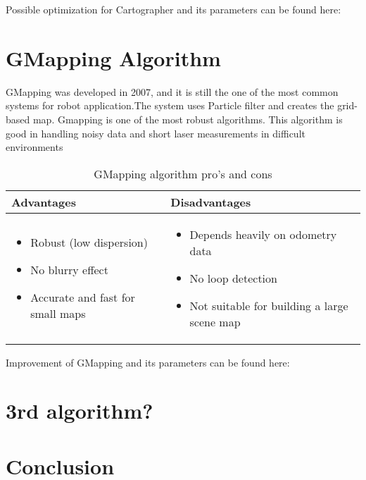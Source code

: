 \documentclass[12pt, a4paper, onecolumn]{article}
\begin{document}
Possible optimization for Cartographer and its parameters can be found here: \cite{CARTO19}
\section{GMapping Algorithm}
GMapping was developed in 2007, and it is still the one of the most common systems for robot application.The system uses Particle ﬁlter and creates the grid-based map. Gmapping is one of the most robust algorithms. This algorithm is good in handling noisy data and short laser measurements in difficult environments \cite{SLAMbench17}
\begin{table}[h!]
\centering
\begin{tabular}{ |p{6cm}||p{6cm}|  }
 \hline
 Advantages&Disadvantages\\
 \hline
\begin{itemize}
  \item Robust (low dispersion) \cite{SLAMQuality}
  \item No blurry effect \cite{SLAMQuality}
  \item Accurate and fast for small maps \cite{SLAMQuality20}
  \end{itemize} 
  & 
  \begin{itemize}
  \item Depends heavily on odometry data
  \item No loop detection \cite{SLAMQuality20}
  \item Not suitable for building a large scene map \cite{SLAMQuality20}
  \end{itemize} \\

 \hline
\end{tabular}
\caption{GMapping algorithm pro's and cons}
\label{table:2}
\end{table}

Improvement of GMapping and its parameters can be found here: \cite{SLAMQuality20}

\section{3rd algorithm?}

\section{Conclusion}

\end{document}
